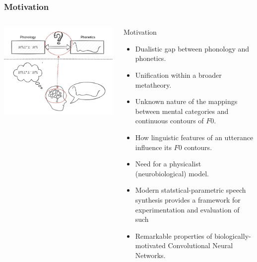 \documentclass[a4paper,9pt]{beamer}
\theoremstyle{mytheoremstyle}
\begin{document}
\begin{frame}
\frametitle{Motivation}
\begin{columns}
\begin{center}
\includegraphics[width=\textwidth]{res/mapping_highlight.png}
\end{center}
\scriptsize{
\begin{exampleblock}{Motivation}
\begin{itemize}
\item[\checkmark] Dualistic gap between phonology and phonetics.
\item[\checkmark] Unification within a broader metatheory.
\item[\checkmark] Unknown nature of the mappings between mental categories and continuous contours of $F0$.
\item[\checkmark] How linguistic features of an utterance influence its $F0$ contours.
\item[\checkmark] Need for a physicalist (neurobiological) model.
\item[\checkmark] Modern statstical-parametric speech synthesis provides a framework for experimentation and evaluation of such
\item[\checkmark] Remarkable properties of biologically-motivated Convolutional Neural Networks.
\end{itemize}
\end{exampleblock}
}
\end{columns}
\end{frame}
\end{document}
